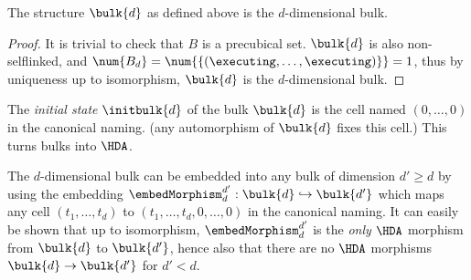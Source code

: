

    \begin{lemma}
        \label{lemma:chu-labelling-bulk}
        The structure $\bulk{d}$ as defined above is the $d$-dimensional bulk.
    \end{lemma}

    \begin{proof}
        It is trivial to check that $B$ is a precubical set.  $\bulk{d}$ is also non-selflinked, and $\num{ B_d}= \num{\{( \executing,\dotsc, \executing)\}}= 1$, thus by uniqueness up to isomorphism, $\bulk{d}$ is the $d$-dimensional bulk.
    \end{proof}

    The \emph{initial state} $\initbulk{d}$ of the bulk $\bulk{d}$ is the cell named $( 0,\dotsc, 0)$ in the canonical naming.  (any automorphism of $\bulk{d}$ fixes this cell.)  This turns bulks into $\HDA$.

    The $d$-dimensional bulk can be embedded into any bulk of dimension $d'\ge d$ by using the embedding $\embedMorphism^{d'}_{d}:\bulk{d}\hookrightarrow \bulk{d'}$ which maps any cell $( t_1,\dotsc, t_d)$ to $( t_1,\dotsc, t_d, 0,\dotsc, 0)$ in the canonical naming.  It can easily be shown that up to isomorphism, $\embedMorphism^{ d'}_d$ is the \emph{only} $\HDA$ morphism from $\bulk{ d}$ to $\bulk{ d'}$, hence also that there are no $\HDA$ morphisms $\bulk{d}\to \bulk{d'}$ for $d'< d$.

